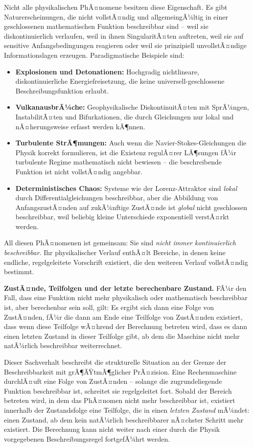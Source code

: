 ﻿\documentclass[12pt, a4paper]{article}
\begin{document}
	Nicht alle physikalischen PhÃ¤nomene besitzen diese Eigenschaft. Es gibt Naturerscheinungen, die nicht vollstÃ¤ndig und allgemeingÃ¼ltig in einer geschlossenen mathematischen Funktion beschreibbar sind -- weil sie diskontinuierlich verlaufen, weil in ihnen SingularitÃ¤ten auftreten, weil sie auf sensitive Anfangsbedingungen reagieren oder weil sie prinzipiell unvollstÃ¤ndige Informationslagen erzeugen. Paradigmatische Beispiele sind:

	\begin{itemize}
		\item \textbf{Explosionen und Detonationen:} Hochgradig nichtlineare, diskontinuierliche Energiefreisetzung, die keine universell-geschlossene Beschreibungsfunktion erlaubt.
		\item \textbf{VulkanausbrÃ¼che:} Geophysikalische DiskontinuitÃ¤ten mit SprÃ¼ngen, InstabilitÃ¤ten und Bifurkationen, die durch Gleichungen nur lokal und nÃ¤herungsweise erfasst werden kÃ¶nnen.
		\item \textbf{Turbulente StrÃ¶mungen:} Auch wenn die Navier-Stokes-Gleichungen die Physik korrekt formulieren, ist die Existenz regulÃ¤rer LÃ¶sungen fÃ¼r turbulente Regime mathematisch nicht bewiesen -- die beschreibende Funktion ist nicht vollstÃ¤ndig angebbar.
		\item \textbf{Deterministisches Chaos:} Systeme wie der Lorenz-Attraktor sind \textit{lokal} durch Differentialgleichungen beschreibbar, aber die Abbildung von AnfangszustÃ¤nden auf zukÃ¼nftige ZustÃ¤nde ist \textit{global} nicht geschlossen beschreibbar, weil beliebig kleine Unterschiede exponentiell verstÃ¤rkt werden.
	\end{itemize}

	All diesen PhÃ¤nomenen ist gemeinsam: Sie sind \textit{nicht immer kontinuierlich beschreibbar}. Ihr physikalischer Verlauf enthÃ¤lt Bereiche, in denen keine endliche, regelgeleitete Vorschrift existiert, die den weiteren Verlauf vollstÃ¤ndig bestimmt.

	\textbf{ZustÃ¤nde, Teilfolgen und der letzte berechenbare Zustand.}
	FÃ¼r den Fall, dass eine Funktion nicht mehr physikalisch oder mathematisch beschreibbar ist, aber berechenbar sein soll, gilt: Es ergibt sich dann eine Folge von ZustÃ¤nden, fÃ¼r die dann am Ende eine Teilfolge von ZustÃ¤nden existiert, dass wenn diese Teilfolge wÃ¤hrend der Berechnung betreten wird, dass es dann einen letzten Zustand in dieser Teilfolge gibt, ab dem die Maschine nicht mehr natÃ¼rlich beschreibbar weiterrechnet.

	Dieser Sachverhalt beschreibt die strukturelle Situation an der Grenze der Beschreibbarkeit mit grÃ¶ÃŸtmÃ¶glicher PrÃ¤zision. Eine Rechenmaschine durchlÃ¤uft eine Folge von ZustÃ¤nden -- solange die zugrundeliegende Funktion beschreibbar ist, schreitet sie regelgeleitet fort. Sobald der Bereich betreten wird, in dem das PhÃ¤nomen nicht mehr beschreibbar ist, existiert innerhalb der Zustandsfolge eine Teilfolge, die in einen \textit{letzten Zustand} mÃ¼ndet: einen Zustand, ab dem kein natÃ¼rlich beschreibbarer nÃ¤chster Schritt mehr existiert. Die Berechnung kann nicht weiter nach einer durch die Physik vorgegebenen Beschreibungsregel fortgefÃ¼hrt werden.
\end{document}
